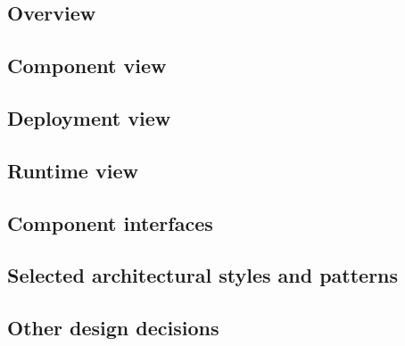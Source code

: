 \subsection{Overview}
\subsection{Component view}
\subsection{Deployment view}
\subsection{Runtime view}


\subsection{Component interfaces}

\subsection{Selected architectural styles and patterns}
\subsection{Other design decisions}

